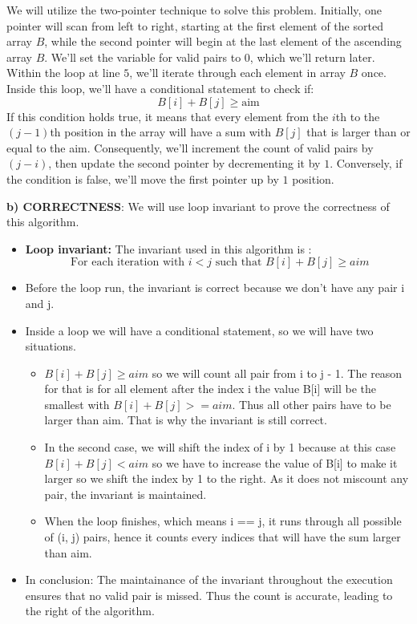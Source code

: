 \documentclass{article}
\begin{document}
	We will utilize the two-pointer technique to solve this problem. Initially, one pointer will scan from left to right, starting at the first element of the sorted array $B$, while the second pointer will begin at the last element of the ascending array $B$. We'll set the variable for valid pairs to $0$, which we'll return later. Within the loop at line $5$, we'll iterate through each element in array $B$ once. Inside this loop, we'll have a conditional statement to check if:
	\[ B[i] + B[j] \geq \text{aim} \]
	If this condition holds true, it means that every element from the $i$th to the $(j - 1)$th position in the array will have a sum with $B[j]$ that is larger than or equal to the aim. Consequently, we'll increment the count of valid pairs by $(j - i)$, then update the second pointer by decrementing it by $1$. Conversely, if the condition is false, we'll move the first pointer up by $1$ position.


\textbf{b) CORRECTNESS}: We will use loop invariant to prove the correctness of this algorithm.
\begin{itemize}
	\item \textbf{Loop invariant: } The invariant used in this algorithm is :
	\begin{equation}
		\text{ For each iteration with }  i < j \text{ such that } B[i] + B[j] \geq aim 
		\end{equation}
	\item Before the loop run, the invariant is correct because we don't have any pair i and j.
	\item Inside a loop we will have a conditional statement, so we will have two situations.
	\begin{itemize}
		\item \(B[i] + B[j] \geq aim\) so we will count all pair from i to j - 1. The reason for that is for all element after the index i the value B[i] will be the smallest with \(B[i] + B[j] >= aim\). Thus all other pairs have to be larger than aim. That is why the invariant is still correct.
		\item In the second case, we will shift the index of i by 1 because at this case \(B[i] + B[j] < aim\) so we have to increase the value of B[i] to make it larger so we shift the index by 1 to the right. As it does not miscount any pair, the invariant is maintained.
		\item When the loop finishes, which means i == j, it runs through all possible of (i, j) pairs, hence it counts every  indices that will have the sum larger than aim. 
	\end{itemize}
	\item In conclusion: The maintainance of the invariant throughout the execution ensures that no valid pair is missed. Thus the count is accurate, leading to the right of the algorithm.
\end{itemize}
\end{document}
